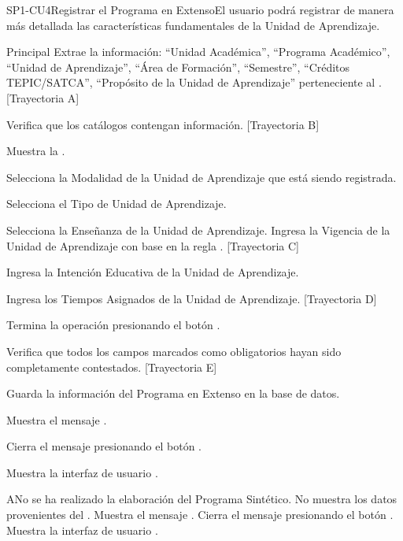 \begin{UseCase}{SP1-CU4}{Registrar el Programa en Extenso}{El usuario podrá registrar de manera más detallada las características fundamentales de la Unidad de Aprendizaje.}
\begin{UCtrayectoria}{Principal}
	\UCpaso Extrae la información: ``Unidad Académica'', ``Programa Académico'', ``Unidad de Aprendizaje'', ``Área de Formación'', ``Semestre'', ``Créditos TEPIC/SATCA'', ``Propósito de la Unidad de Aprendizaje'' perteneciente al . [Trayectoria A]
	
	\UCpaso Verifica que los catálogos contengan información. [Trayectoria B]
	
	\UCpaso Muestra la . 
	
	\UCpaso[\UCactor] Selecciona la Modalidad de la Unidad de Aprendizaje que está siendo registrada. %
	
	\UCpaso[\UCactor] Selecciona el Tipo de Unidad de Aprendizaje. %
	
	\UCpaso[\UCactor] Selecciona la Enseñanza de la Unidad de Aprendizaje. %
	\UCpaso[\UCactor] Ingresa la Vigencia de la Unidad de Aprendizaje con base en la regla . [Trayectoria C]
	
	\UCpaso[\UCactor] Ingresa la Intención Educativa de la Unidad de Aprendizaje.
	
	\UCpaso[\UCactor] Ingresa los Tiempos Asignados de la Unidad de Aprendizaje. [Trayectoria D]
	
	\UCpaso[\UCactor] Termina la operación presionando el botón .
        
    \UCpaso Verifica que todos los campos marcados como obligatorios hayan sido completamente contestados. [Trayectoria E]
    
    \UCpaso Guarda la información del Programa en Extenso en la base de datos.
    
    \UCpaso Muestra el mensaje .
    
    \UCpaso[\UCactor] Cierra el mensaje presionando el botón .
    
    \UCpaso Muestra la interfaz de usuario .
\end{UCtrayectoria}


\begin{UCtrayectoriaA}{A}{No se ha realizado la elaboración del Programa Sintético}.
	\UCpaso No muestra los datos provenientes del .
	\UCpaso Muestra el mensaje .
	\UCpaso[\UCactor] Cierra el mensaje presionando el botón .
	\UCpaso Muestra la interfaz de usuario .
\end{UCtrayectoriaA}


\end{UseCase}
